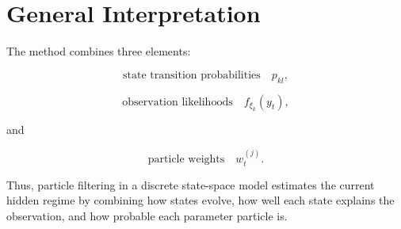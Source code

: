 \documentclass[a4paper]{article}
\begin{document}
    
    \section{General Interpretation}
        
        The method combines three elements:
        
        \[
            \text{state transition probabilities}
            \quad
            p_{kl},
        \]
        
        \[
            \text{observation likelihoods}
            \quad
            f_{\xi_k}(y_t),
        \]
        
        and
        
        \[
            \text{particle weights}
            \quad
            w_t^{(j)}.
        \]
        
        Thus, particle filtering in a discrete state-space model estimates the current hidden regime by combining how states evolve, how well each state explains the observation, and how probable each parameter particle is.
        
        
        
\end{document}
